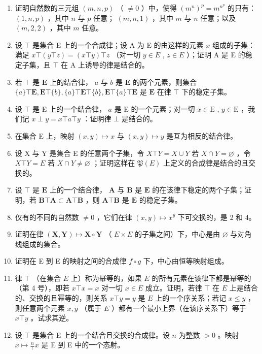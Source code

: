 \begin{enumerate}
\def\labelenumi{\arabic{enumi}.}
\setcounter{enumi}{4}
\item
  证明自然数的三元组 \((m, n, p)\) （ \(\neq 0\) ）中，使得 \((m^n)^p = m^{n^p}\) 的只有： \((1, n, p)\) ，其中 \(n\) 与 \(p\) 任意； \((m, n, 1)\) ，其中 \(m\) 与 \(n\) 任意；以及 \((m, 2, 2)\) ，其中 \(m\) 任意。
\item
  设 \(\top\) 是集合 E 上的一个合成律；设 A 为 E 的由这样的元素 \(x\) 组成的子集：满足 \(x \top (y \top z) = (x \top y) \top z\) （对一切 \(y \in E\) , \(z \in E\) ）；证明 A 是 E 的稳定子集，且 \(\top\) 在 A 上诱导的律是结合的。
\item
  若 \(\top\) 是 \(\mathbf{E}\) 上的结合律， \(a\) 与 \(b\) 是 \(\mathbf{E}\) 的两个元素，则集合 \(\{a\} \top \mathbf{E}, \mathbf{E} \top \{b\}, \{a\} \top \mathbf{E} \top \{b\}, \mathbf{E} \top \{a\} \top \mathbf{E}\) 是 \(\mathbf{E}\) 在律 \(\top\) 下的稳定子集。
\item
  设 \(\top\) 是 E 上的一个结合律， \(a\) 是 E 的一个元素；对一切 \(x \in \mathrm{E}\) , \(y \in \mathrm{E}\) ，我们记 \(x \perp y = x \top a \top y\) ：证明律 \(\bot\) 是结合的。
\item
  在集合 E 上，映射 \((x,y)\mapsto x\) 与 \((x,y)\mapsto y\) 是互为相反的结合律。
\item
  设 X 与 Y 是集合 E 的任意两个子集，令 \(X \top Y = X \cup Y\) 若 \(X \cap Y = \varnothing\) ，令 \(X \top Y = E\) 若 \(X \cap Y \neq \varnothing\) ；证明这样在 \(\mathfrak{P}(E)\) 上定义的合成律是结合的且交换的。
\item
  设 \(\top\) 是 \(\mathbf{E}\) 上的一个结合律， \(\mathbf{A}\) 与 \(\mathbf{B}\) 是 \(\mathbf{E}\) 的在该律下稳定的两个子集；证明，若 \(\mathbf{B} \top \mathbf{A} \subset \mathbf{A} \top \mathbf{B}\) ，则 \(\mathbf{A} \top \mathbf{B}\) 是 \(\mathbf{E}\) 的稳定子集。
\item
  仅有的不同的自然数 \(\neq 0\) ，它们在律 \((x,y)\mapsto x^{y}\) 下可交换的，是 2 和 4。
\item
  证明在律 \((\mathbf{X}, \mathbf{Y}) \mapsto \mathbf{X} \circ \mathbf{Y}\) （ \(E \times E\) 的子集之间）下，中心是由 \(\varnothing\) 与对角线组成的集合。
\item
  证明在 E 到 E 的映射之间的合成律 \(f \circ g\) 下，中心由恒等映射组成。
\item
  律 \(\top\) （在集合 \(E\) 上）称为幂等的，如果 \(E\) 的所有元素在该律下都是幂等的（第 4 号），即若 \(x \top x = x\) 对一切 \(x \in E\) 成立。证明，若律 \(\top\) 在 \(E\) 上是结合的、交换的且幂等的，则关系 \(x \top y = y\) 是 \(E\) 上的一个序关系；若记 \(x \leqslant y\) ，则任意两个元素 \(x, y\) （属于 \(E\) ）都有一个最小上界（在该序关系下）等于 \(x \top y\) 。试求其逆。
\item
  设 \(\top\) 是集合 E 上的一个结合且交换的合成律。设 \(n\) 为整数 \(>0\) 。映射 \(x \mapsto \frac{n}{\top} x\) 是 E 到 E 中的一个态射。
\end{enumerate}

